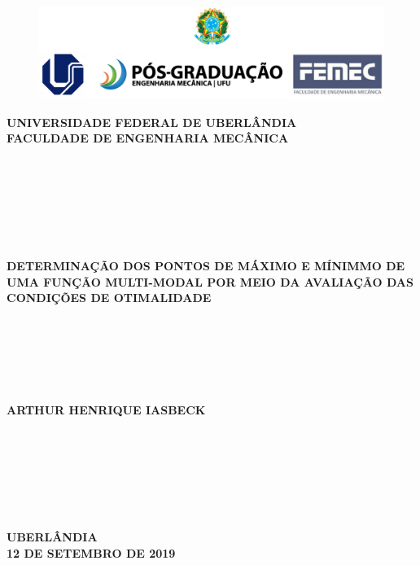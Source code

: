 \documentclass[12pt]{article}
\begin{document}
	\singlespacing %
	
	\thispagestyle{empty}
	
	\begin{figure}[H]
		\centering
		\includegraphics[width=\linewidth]{cabecalho.png}
	\end{figure}
	
	\begin{center}
		\large
		\textbf{UNIVERSIDADE FEDERAL DE UBERLÂNDIA} \\ \vspace{0.3cm}
		\textbf{FACULDADE DE ENGENHARIA MECÂNICA} \\~\\~\\~\\~\\~\\~\\~\\
		\Large
		\textbf{DETERMINAÇÃO DOS PONTOS DE MÁXIMO E MÍNIMMO DE UMA FUNÇÃO MULTI-MODAL POR MEIO DA AVALIAÇÃO DAS CONDIÇÕES DE OTIMALIDADE} \\~\\~\\~\\~\\~\\~\\
		\large
		\textbf{ARTHUR HENRIQUE IASBECK} \\~\\~\\~\\~\\~\\~\\~\\
		\large
		\textbf{UBERLÂNDIA} \\
		\textbf{12 DE SETEMBRO DE 2019}
	\end{center}
	\newpage
	\restoregeometry
	
	\setcounter{page}{1} %
	
\end{document}
